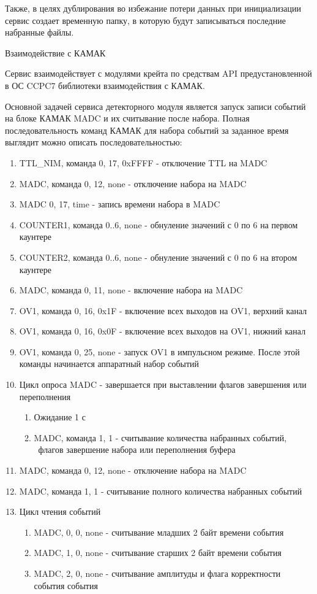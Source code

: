 \documentclass{article}
\begin{document}
\bigskip

Также, в целях дублирования во избежание потери данных при инициализации сервис создает временную папку, в которую будут записываться последние набранные файлы.

Взаимодействие с КАМАК

Сервис взаимодействует с модулями крейта по средствам API предустановленной в ОС CCPC7 библиотеки взаимодействия с КАМАК.


\bigskip

Основной задачей сервиса детекторного модуля является запуск записи событий на блоке КАМАК MADC и их считывание после набора. Полная последовательность команд КАМАК для набора событий за заданное время выглядит можно описать последовательностью:

\begin{enumerate}
\item TTL\_NIM, команда 0, 17, 0xFFFF - отключение TTL на MADC
\item MADC, команда 0, 12, none - отключение набора на MADC
\item MADC 0, 17, time - запись времени набора в MADC
\item COUNTER1, команда 0..6, none - обнуление значений с 0 по 6 на первом каунтере
\item COUNTER2, команда 0..6, none - обнуление значений с 0 по 6 на втором каунтере
\item MADC, команда 0, 11, none - включение набора на MADC
\item OV1, команда 0, 16, 0x1F - включение всех выходов на OV1, верхний канал
\item OV1, команда 0, 16, 0x0F - включение всех выходов на OV1, нижний канал
\item OV1, команда 0, 25, none - запуск OV1 в импульсном режиме. После этой команды начинается аппаратный набор событий
\item Цикл опроса MADC - завершается при выставлении флагов завершения или переполнения

\begin{enumerate}
\item Ожидание 1 с
\item MADC, команда 1, 1 - считывание количества набранных событий, \ флагов завершение набора или переполнения буфера
\end{enumerate}
\item MADC, команда 0, 12, none - отключение набора на MADC
\item MADC, команда 1, 1 - считывание полного количества набранных событий
\item Цикл чтения событий

\begin{enumerate}
\item MADC, 0, 0, none - считывание младших 2 байт времени события
\item MADC, 1, 0, none - считывание старших 2 байт времени события
\item MADC, 2, 0, none - считывание амплитуды и флага корректности события события
\end{enumerate}
\end{enumerate}
\end{document}
